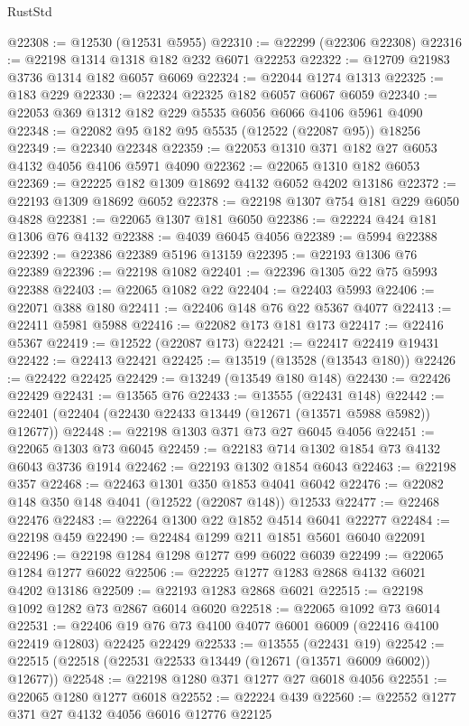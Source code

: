 \begin{lexlean}{RustStd}
\begin{coremodule}
@22308 := @12530 (@12531 @5955)
@22310 := @22299 (@22306 @22308)
@22316 := @22198 @1314 @1318 @182 @232 @6071 @22253
@22322 := @12709 @21983 @3736 @1314 @182 @6057 @6069
@22324 := @22044 @1274 @1313
@22325 := @183 @229
@22330 := @22324 @22325 @182 @6057 @6067 @6059
@22340 := @22053 @369 @1312 @182 @229 @5535 @6056 @6066 @4106 @5961 @4090
@22348 := @22082 @95 @182 @95 @5535 (@12522 (@22087 @95)) @18256
@22349 := @22340 @22348
@22359 := @22053 @1310 @371 @182 @27 @6053 @4132 @4056 @4106 @5971 @4090
@22362 := @22065 @1310 @182 @6053
@22369 := @22225 @182 @1309 @18692 @4132 @6052 @4202 @13186
@22372 := @22193 @1309 @18692 @6052
@22378 := @22198 @1307 @754 @181 @229 @6050 @4828
@22381 := @22065 @1307 @181 @6050
@22386 := @22224 @424 @181 @1306 @76 @4132
@22388 := @4039 @6045 @4056
@22389 := @5994 @22388
@22392 := @22386 @22389 @5196 @13159
@22395 := @22193 @1306 @76 @22389
@22396 := @22198 @1082
@22401 := @22396 @1305 @22 @75 @5993 @22388
@22403 := @22065 @1082 @22
@22404 := @22403 @5993
@22406 := @22071 @388 @180
@22411 := @22406 @148 @76 @22 @5367 @4077
@22413 := @22411 @5981 @5988
@22416 := @22082 @173 @181 @173
@22417 := @22416 @5367
@22419 := @12522 (@22087 @173)
@22421 := @22417 @22419 @19431
@22422 := @22413 @22421
@22425 := @13519 (@13528 (@13543 @180))
@22426 := @22422 @22425
@22429 := @13249 (@13549 @180 @148)
@22430 := @22426 @22429
@22431 := @13565 @76
@22433 := @13555 (@22431 @148)
@22442 := @22401 (@22404 (@22430 @22433 @13449 (@12671 (@13571 @5988 @5982)) @12677))
@22448 := @22198 @1303 @371 @73 @27 @6045 @4056
@22451 := @22065 @1303 @73 @6045
@22459 := @22183 @714 @1302 @1854 @73 @4132 @6043 @3736 @1914
@22462 := @22193 @1302 @1854 @6043
@22463 := @22198 @357
@22468 := @22463 @1301 @350 @1853 @4041 @6042
@22476 := @22082 @148 @350 @148 @4041 (@12522 (@22087 @148)) @12533
@22477 := @22468 @22476
@22483 := @22264 @1300 @22 @1852 @4514 @6041 @22277
@22484 := @22198 @459
@22490 := @22484 @1299 @211 @1851 @5601 @6040 @22091
@22496 := @22198 @1284 @1298 @1277 @99 @6022 @6039
@22499 := @22065 @1284 @1277 @6022
@22506 := @22225 @1277 @1283 @2868 @4132 @6021 @4202 @13186
@22509 := @22193 @1283 @2868 @6021
@22515 := @22198 @1092 @1282 @73 @2867 @6014 @6020
@22518 := @22065 @1092 @73 @6014
@22531 := @22406 @19 @76 @73 @4100 @4077 @6001 @6009 (@22416 @4100 @22419 @12803) @22425 @22429
@22533 := @13555 (@22431 @19)
@22542 := @22515 (@22518 (@22531 @22533 @13449 (@12671 (@13571 @6009 @6002)) @12677))
@22548 := @22198 @1280 @371 @1277 @27 @6018 @4056
@22551 := @22065 @1280 @1277 @6018
@22552 := @22224 @439
@22560 := @22552 @1277 @371 @27 @4132 @4056 @6016 @12776 @22125

\end{coremodule}
\end{lexlean}

